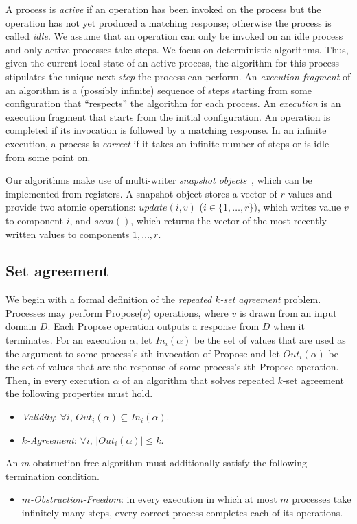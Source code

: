 \documentclass[11pt]{article}
\begin{document}
A process is \emph{active} if 
an operation has been invoked on the process but the operation
has not yet produced a matching response; otherwise the process is
called \emph{idle}.  We assume that 
an operation can only be invoked on an idle process and only
active processes take steps.
We focus on deterministic algorithms.
Thus, given the current local state of an active process, the 
algorithm for this process stipulates the unique 
next \emph{step} the process can perform. 
An \emph{execution fragment} of an algorithm
is a (possibly infinite) sequence of
steps starting from some configuration that ``respects'' 
the algorithm for each process.
An \emph{execution} is an execution fragment that starts from the initial
configuration.
An operation is completed if its invocation is followed by
a matching response.
In an infinite execution, a process is \emph{correct} if it takes an infinite number of steps
or is idle from some point on. 

Our algorithms make use of multi-writer \emph{snapshot objects}~\cite{AAD93},
which can be implemented from registers.
A snapshot object stores a vector of $r$ values and 
provide two atomic operations:
$\textit{update}(i,v)$ ($i\in\{1,\ldots,r\}$), which writes value $v$ to
component $i$, and $\textit{scan}()$, 
which returns the vector of the most recently written values to
components $1,\ldots,r$.







\medskip

\subsection{Set agreement}
We begin with a formal definition of the \emph{repeated $k$-set agreement} problem.
Processes may perform  {\sc Propose}($v$) operations, where $v$ is drawn from an input domain $D$. 
Each {\sc Propose} operation outputs a response from $D$ when it terminates. 
For an execution $\alpha$, let $In_i(\alpha)$ be the set of values that are used as the
argument to some process's $i$th invocation of {\sc Propose} and let $Out_i(\alpha)$ be the
set of values that are the response of some process's $i$th  {\sc Propose} operation.  
Then,  in every execution $\alpha$ of an algorithm that solves repeated
$k$-set agreement the following properties must hold.
\begin{itemize}
\item
\emph{Validity}:  $\forall i$, $Out_i(\alpha)\subseteq In_i(\alpha)$.
\item
\emph{$k$-Agreement}:  $\forall i$, $|Out_i(\alpha)|\leq k$.
\end{itemize}
An $m$-obstruction-free algorithm must additionally satisfy the following termination condition.
\begin{itemize}
\item
\emph{$m$-Obstruction-Freedom}: 
in every execution in which 
at most $m$ processes take infinitely many steps, 
every correct process
completes each of its  operations. 
\end{itemize}
\end{document}
